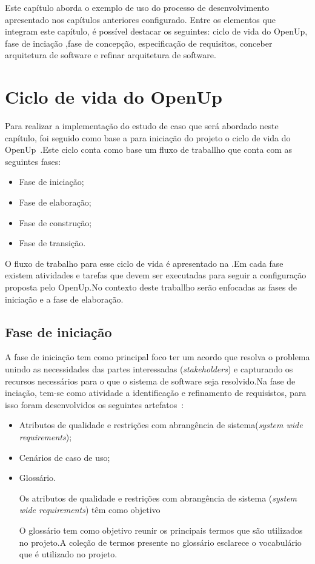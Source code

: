Este capítulo aborda o exemplo de uso do processo de desenvolvimento apresentado nos capítulos anteriores configurado. Entre os elementos que integram este capítulo, é possível destacar os seguintes: ciclo de vida do OpenUp, fase de inciação ,fase de concepção, especificação de requisitos, conceber arquitetura de software e refinar arquitetura de software.

\section{Ciclo de vida do OpenUp}

Para realizar a implementação do estudo de caso que será abordado neste capítulo, foi seguido como base a para iniciação do projeto o ciclo de vida do OpenUp~\cite{openup}.Este ciclo conta como base um fluxo de traballho que conta com as seguintes fases:
\begin{itemize}
    \item Fase de iniciação;
    \item Fase de elaboração;
    \item Fase de construção;
    \item Fase de transição.
\end{itemize}

%

O fluxo de trabalho para esse ciclo de vida é apresentado na .Em cada fase existem atividades e tarefas que devem ser executadas para seguir a configuração proposta pelo OpenUp.No contexto deste traballho serão enfocadas as fases de iniciação e a fase de elaboração.

\subsection{Fase de iniciação}

A fase de iniciação tem como principal foco ter um acordo que resolva o problema unindo as necessidades das partes interessadas (\emph{stakeholders}) e capturando os recursos necessários para o que o sistema de software seja resolvido.Na fase de inciação, tem-se como atividade a identificação e refinamento de requisistos, para isso foram desenvolvidos os seguintes artefatos~\cite{openup}:

\begin{itemize}
    \item Atributos de qualidade e restrições com abrangência de sistema(\emph{system wide requirements});
    \item Cenários de caso de uso;
    \item Glossário.

Os atributos de qualidade e restrições com abrangência de sistema (\emph{system wide requirements}) têm como objetivo  

O glossário tem como objetivo reunir os principais termos que são utilizados no projeto.A coleção de termos presente no glossário esclarece o vocabulário que é utilizado no projeto.    

    
\end{itemize}
